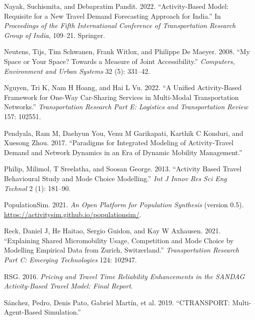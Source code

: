 \documentclass[12pt, oneside, openright]{byuthesis}
\newlength{\cslhangindent}
\newlength{\cslentryspacingunit} %
\newenvironment{CSLReferences}[2] %
 {%
  \setlength{\parindent}{0pt}
  \ifodd #1
  \let\oldpar\par
  \def\par{\hangindent=\cslhangindent\oldpar}
  \fi
  \setlength{\parskip}{#2\cslentryspacingunit}
 }%
 {}
\begin{document}
\begin{CSLReferences}{1}{0}
\leavevmode{}%
Nayak, Suchismita, and Debapratim Pandit. 2022. {``Activity-Based Model: Requisite for a New Travel Demand Forecasting Approach for India.''} In \emph{Proceedings of the Fifth International Conference of Transportation Research Group of India}, 109--21. Springer.

\leavevmode{}%
Neutens, Tijs, Tim Schwanen, Frank Witlox, and Philippe De Maeyer. 2008. {``My Space or Your Space? Towards a Measure of Joint Accessibility.''} \emph{Computers, Environment and Urban Systems} 32 (5): 331--42.

\leavevmode{}%
Nguyen, Tri K, Nam H Hoang, and Hai L Vu. 2022. {``A Unified Activity-Based Framework for One-Way Car-Sharing Services in Multi-Modal Transportation Networks.''} \emph{Transportation Research Part E: Logistics and Transportation Review} 157: 102551.

\leavevmode{}%
Pendyala, Ram M, Daehyun You, Venu M Garikapati, Karthik C Konduri, and Xuesong Zhou. 2017. {``Paradigms for Integrated Modeling of Activity-Travel Demand and Network Dynamics in an Era of Dynamic Mobility Management.''}

\leavevmode{}%
Philip, Milimol, T Sreelatha, and Soosan George. 2013. {``Activity Based Travel Behavioural Study and Mode Choice Modelling.''} \emph{Int J Innov Res Sci Eng Technol} 2 (1): 181--90.

\leavevmode{}%
PopulationSim. 2021. \emph{An Open Platform for Population Synthesis} (version 0.5). \url{https://activitysim.github.io/populationsim/}.

\leavevmode{}%
Reck, Daniel J, He Haitao, Sergio Guidon, and Kay W Axhausen. 2021. {``Explaining Shared Micromobility Usage, Competition and Mode Choice by Modelling Empirical Data from Zurich, Switzerland.''} \emph{Transportation Research Part C: Emerging Technologies} 124: 102947.

\leavevmode{}%
RSG. 2016. \emph{Pricing and Travel Time Reliability Enhancements in the SANDAG Activity-Based Travel Model: Final Report}.

\leavevmode{}%
Sánchez, Pedro, Denis Pato, Gabriel Martín, et al. 2019. {``CTRANSPORT: Multi-Agent-Based Simulation.''}


\end{CSLReferences}
\end{document}
